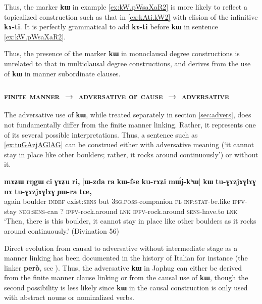 \documentclass[oldfontcommands,oneside,a4paper,11pt]{article}
\newcommand{\ipa}[1]{{\phon\textbf{#1}}}
\begin{document}
Thus, the marker \ipa{kɯ} in example \ref{ex:kW.pWsaXaR2}  is more likely to reflect a topicalized construction such as that in \ref{ex:kAti.kW2}  with elision of the infinitive \ipa{kɤ-ti}. It is perfectly grammatical to add \ipa{kɤ-ti} before \ipa{kɯ} in sentence \ref{ex:kW.pWsaXaR2}. 

Thus, the presence of the marker \ipa{kɯ} in monoclausal degree constructions is unrelated to that in multiclausal degree constructions, and derives from the use of \ipa{kɯ} in manner subordinate clauses. 


 \subsubsection{\textsc{finite manner} $\rightarrow$ \textsc{adversative} or \textsc{cause} $\rightarrow$ \textsc{adversative} }
 
The adversative use of \ipa{kɯ}, while treated separately  in section \ref{sec:advers}, does not fundamentally  differ from the finite manner linking. Rather, it represents one of its several possible interpretations. Thus, a sentence such as  \ref{ex:tuGAzjAGlAG} can be construed either with adversative meaning (`it cannot stay in place like other boulders; rather, it rocks around continuously') or without it.
 
 \begin{exe}
\ex \label{ex:tuGAzjAGlAG}
\gll  
    \ipa{mɤʑɯ}  	\ipa{rŋgɯ}  	\ipa{ci}  	\ipa{ɣɤʑu}  	\ipa{ri,}  	[\ipa{ɯ-zda}  	\ipa{ra}  	\ipa{kɯ-fse}  	\ipa{ku-rɤʑi}  	\ipa{mɯ́j-kʰɯ}]  	\ipa{kɯ}  	\ipa{tu-ɣɤzjɤɣlɤɣ}  	\ipa{nɤ}  	\ipa{tu-ɣɤzjɤɣlɤɣ}  	\ipa{ɲɯ-ra}  	\ipa{tɕe,}  \\
    again boulder \textsc{indef} exist:\textsc{sens} but \textsc{3sg.poss}-companion \textsc{pl} \textsc{inf:stat}-be.like \textsc{ipfv}-stay \textsc{neg:sens}-can ?{ } \textsc{ipfv}-rock.around \textsc{lnk} \textsc{ipfv}-rock.around  \textsc{sens}-have.to \textsc{lnk}     \\
   \glt `Then, there is this boulder, it cannot stay in place like other boulders as it rocks around continuously.' (Divination  56)
 \end{exe}
 
Direct evolution from causal to adversative without intermediate stage as a manner linking has been documented in the history of Italian for instance (the linker \ipa{però}, see  \citealt{mauri12adversative}). Thus, 
the adversative \ipa{kɯ} in Japhug can either be derived from the finite manner clause linking or from the causal use of  \ipa{kɯ}, though the second possibility is less likely since \ipa{kɯ} in the causal construction is only used with abstract nouns or nominalized verbs.
 
\end{document}
